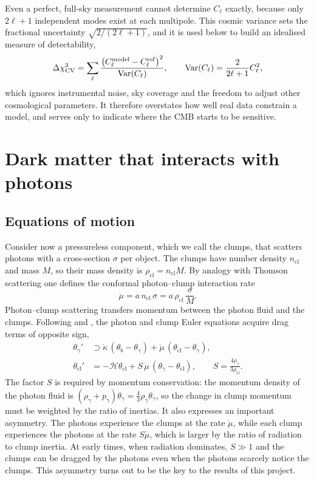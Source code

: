 \documentclass[11pt,a4paper]{article}
\newcommand{\cl}{\mathrm{cl}}
\begin{document}
Even a perfect, full-sky measurement cannot determine $C_\ell$ exactly, because only $2\ell+1$ independent modes exist at each multipole. This cosmic variance sets the fractional uncertainty $\sqrt{2/(2\ell+1)}$, and it is used below to build an idealised measure of detectability,
\begin{equation}
\Delta\chi^2_{\rm CV} = \sum_\ell \frac{\left(C_\ell^{\rm model}-C_\ell^{\rm ref}\right)^2}{\mathrm{Var}(C_\ell)},\qquad \mathrm{Var}(C_\ell)=\frac{2}{2\ell+1}C_\ell^2,
\label{eq:chi2cv}
\end{equation}
which ignores instrumental noise, sky coverage and the freedom to adjust other cosmological parameters. It therefore overstates how well real data constrain a model, and serves only to indicate where the CMB starts to be sensitive.

\section{Dark matter that interacts with photons}
\label{sec:idm}

\subsection{Equations of motion}

Consider now a pressureless component, which we call the clumps, that scatters photons with a cross-section $\sigma$ per object. The clumps have number density $n_\cl$ and mass $M$, so their mass density is $\rho_\cl = n_\cl M$. By analogy with Thomson scattering one defines the conformal photon--clump interaction rate
\begin{equation}
\dot\mu = a\, n_\cl\, \sigma = a\,\rho_\cl\,\frac{\sigma}{M}.
\label{eq:mudot}
\end{equation}
Photon--clump scattering transfers momentum between the photon fluid and the clumps. Following \citet{Boehm2001} and \citet{Wilkinson2014}, the photon and clump Euler equations acquire drag terms of opposite sign,
\begin{align}
\theta_\gamma' &\supset \dot\kappa\,(\theta_b - \theta_\gamma) + \dot\mu\,(\theta_\cl - \theta_\gamma), \label{eq:photon_euler}\\
\theta_\cl' &= -\mathcal{H}\theta_\cl + S\,\dot\mu\,(\theta_\gamma - \theta_\cl), \qquad S = \frac{4\rho_\gamma}{3\rho_\cl}. \label{eq:clump_euler}
\end{align}
The factor $S$ is required by momentum conservation: the momentum density of the photon fluid is $(\rho_\gamma + p_\gamma)\theta_\gamma = \tfrac43\rho_\gamma\theta_\gamma$, so the change in clump momentum must be weighted by the ratio of inertias. It also expresses an important asymmetry. The photons experience the clumps at the rate $\dot\mu$, while each clump experiences the photons at the rate $S\dot\mu$, which is larger by the ratio of radiation to clump inertia. At early times, when radiation dominates, $S \gg 1$ and the clumps can be dragged by the photons even when the photons scarcely notice the clumps. This asymmetry turns out to be the key to the results of this project.
\end{document}
